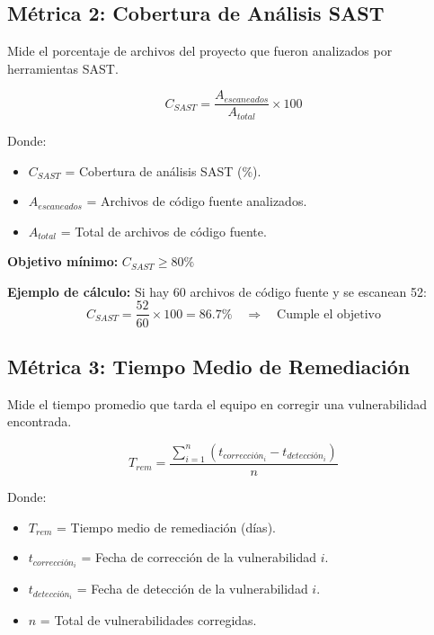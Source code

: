 \subsection{Métrica 2: Cobertura de Análisis SAST}

Mide el porcentaje de archivos del proyecto que fueron analizados por herramientas SAST.

\begin{equation}
C_{SAST} = \frac{A_{escaneados}}{A_{total}} \times 100
\end{equation}

Donde:
\begin{itemize}
    \item $C_{SAST}$ = Cobertura de análisis SAST (\%).
    \item $A_{escaneados}$ = Archivos de código fuente analizados.
    \item $A_{total}$ = Total de archivos de código fuente.
\end{itemize}

\textbf{Objetivo mínimo:} $C_{SAST} \geq 80\%$

\textbf{Ejemplo de cálculo:} Si hay 60 archivos de código fuente y se escanean 52:
\begin{equation}
C_{SAST} = \frac{52}{60} \times 100 = 86.7\% \quad \Rightarrow \quad \text{Cumple el objetivo}
\end{equation}

\subsection{Métrica 3: Tiempo Medio de Remediación}

Mide el tiempo promedio que tarda el equipo en corregir una vulnerabilidad encontrada.

\begin{equation}
T_{rem} = \frac{\sum_{i=1}^{n} (t_{corrección_i} - t_{detección_i})}{n}
\end{equation}

Donde:
\begin{itemize}
    \item $T_{rem}$ = Tiempo medio de remediación (días).
    \item $t_{corrección_i}$ = Fecha de corrección de la vulnerabilidad $i$.
    \item $t_{detección_i}$ = Fecha de detección de la vulnerabilidad $i$.
    \item $n$ = Total de vulnerabilidades corregidas.
\end{itemize}


